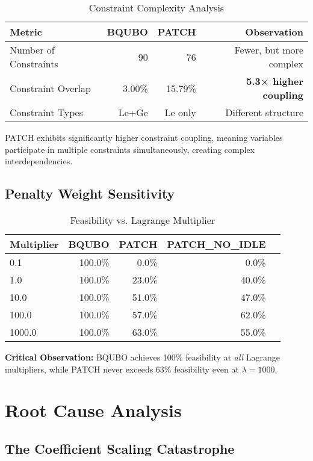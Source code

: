 \documentclass[11pt,a4paper]{article}
\begin{document}
\begin{table}[H]
\centering
\caption{Constraint Complexity Analysis}
\begin{tabular}{lrrr}
\toprule
\textbf{Metric} & \textbf{BQUBO} & \textbf{PATCH} & \textbf{Observation} \\
\midrule
Number of Constraints & 90 & 76 & Fewer, but more complex \\
Constraint Overlap & 3.00\% & 15.79\% & \textbf{5.3× higher coupling} \\
Constraint Types & Le+Ge & Le only & Different structure \\
\bottomrule
\end{tabular}
\end{table}

PATCH exhibits significantly higher constraint coupling, meaning variables participate in multiple constraints simultaneously, creating complex interdependencies.

\subsection{Penalty Weight Sensitivity}

\begin{table}[H]
\centering
\caption{Feasibility vs. Lagrange Multiplier}
\begin{tabular}{lrrrr}
\toprule
\textbf{Multiplier} & \textbf{BQUBO} & \textbf{PATCH} & \textbf{PATCH\_NO\_IDLE} \\
\midrule
0.1 & 100.0\% & 0.0\% & 0.0\% \\
1.0 & 100.0\% & 23.0\% & 40.0\% \\
10.0 & 100.0\% & 51.0\% & 47.0\% \\
100.0 & 100.0\% & 57.0\% & 62.0\% \\
1000.0 & 100.0\% & 63.0\% & 55.0\% \\
\bottomrule
\end{tabular}
\end{table}

\textbf{Critical Observation:} BQUBO achieves 100\% feasibility at \textit{all} Lagrange multipliers, while PATCH never exceeds 63\% feasibility even at $\lambda = 1000$.

\section{Root Cause Analysis}

\subsection{The Coefficient Scaling Catastrophe}
\end{document}
